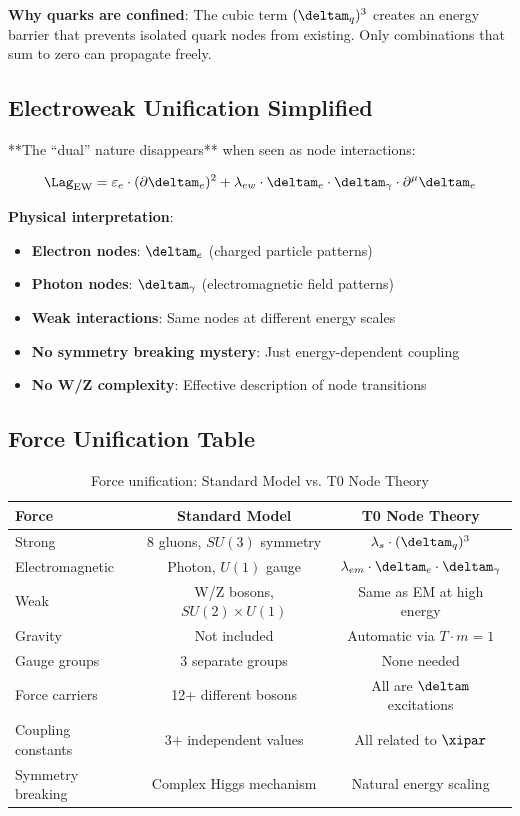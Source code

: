 	\textbf{Why quarks are confined}:
	The cubic term $(\deltam_q)^3$ creates an energy barrier that prevents isolated quark nodes from existing. Only combinations that sum to zero can propagate freely.
	
	\subsection{Electroweak Unification Simplified}
	
	**The ``dual'' nature disappears** when seen as node interactions:
	
	\begin{equation}
		\Lag_{\text{EW}} = \varepsilon_e \cdot (\partial \deltam_e)^2 + \lambda_{ew} \cdot \deltam_e \cdot \deltam_\gamma \cdot \partial^\mu \deltam_e
	\end{equation}
	
	\textbf{Physical interpretation}:
	\begin{itemize}
		\item \textbf{Electron nodes}: $\deltam_e$ (charged particle patterns)
		\item \textbf{Photon nodes}: $\deltam_\gamma$ (electromagnetic field patterns)
		\item \textbf{Weak interactions}: Same nodes at different energy scales
		\item \textbf{No symmetry breaking mystery}: Just energy-dependent coupling
		\item \textbf{No W/Z complexity}: Effective description of node transitions
	\end{itemize}
	
	\subsection{Force Unification Table}
	
	\begin{table}[htbp]
		\centering
		\begin{tabular}{lcc}
			\toprule
			\textbf{Force} & \textbf{Standard Model} & \textbf{T0 Node Theory} \\
			\midrule
			Strong & 8 gluons, $SU(3)$ symmetry & $\lambda_s \cdot (\deltam_q)^3$ \\
			Electromagnetic & Photon, $U(1)$ gauge & $\lambda_{em} \cdot \deltam_e \cdot \deltam_\gamma$ \\
			Weak & W/Z bosons, $SU(2) \times U(1)$ & Same as EM at high energy \\
			Gravity & Not included & Automatic via $T \cdot m = 1$ \\
			\midrule
			Gauge groups & 3 separate groups & None needed \\
			Force carriers & 12+ different bosons & All are $\deltam$ excitations \\
			Coupling constants & 3+ independent values & All related to $\xipar$ \\
			Symmetry breaking & Complex Higgs mechanism & Natural energy scaling \\
			\bottomrule
		\end{tabular}
		\caption{Force unification: Standard Model vs. T0 Node Theory}
		\label{tab:force_unification}
	\end{table}
	

